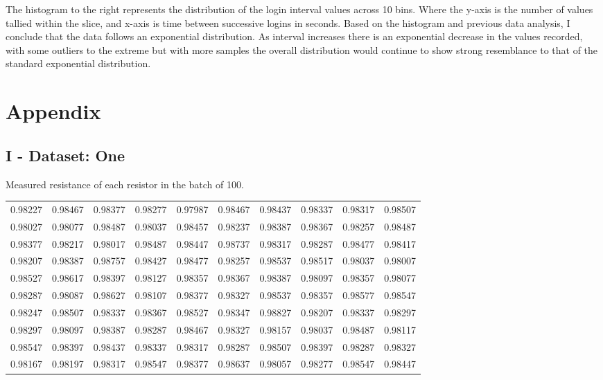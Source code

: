 \documentclass[10pt]{report}
\begin{document}
The histogram to the right represents the distribution of the login interval values across 10 bins.
Where the y-axis is the number of values tallied within the slice, and x-axis is time between successive logins
in seconds.
Based on the histogram and previous data analysis, I conclude that the data follows an exponential distribution. As
interval increases there is an exponential decrease in the values recorded, with some outliers to the extreme but 
with more samples the overall distribution would continue to show strong resemblance to that of the standard
exponential distribution.


\newpage
\section*{Appendix}

\subsection*{I - Dataset: One}

Measured resistance of each resistor in the batch of 100.


\begin{tabular}{rrrrrrrrrr}
    \hline
     0.98227 & 0.98467 & 0.98377 & 0.98277 & 0.97987 & 0.98467 & 0.98437 & 0.98337 & 0.98317 & 0.98507 \\
      0.98027 & 0.98077 & 0.98487 & 0.98037 & 0.98457 & 0.98237 & 0.98387 & 0.98367 & 0.98257 & 0.98487 \\
       0.98377 & 0.98217 & 0.98017 & 0.98487 & 0.98447 & 0.98737 & 0.98317 & 0.98287 & 0.98477 & 0.98417 \\
        0.98207 & 0.98387 & 0.98757 & 0.98427 & 0.98477 & 0.98257 & 0.98537 & 0.98517 & 0.98037 & 0.98007 \\
         0.98527 & 0.98617 & 0.98397 & 0.98127 & 0.98357 & 0.98367 & 0.98387 & 0.98097 & 0.98357 & 0.98077 \\
          0.98287 & 0.98087 & 0.98627 & 0.98107 & 0.98377 & 0.98327 & 0.98537 & 0.98357 & 0.98577 & 0.98547 \\
           0.98247 & 0.98507 & 0.98337 & 0.98367 & 0.98527 & 0.98347 & 0.98827 & 0.98207 & 0.98337 & 0.98297 \\
            0.98297 & 0.98097 & 0.98387 & 0.98287 & 0.98467 & 0.98327 & 0.98157 & 0.98037 & 0.98487 & 0.98117 \\
             0.98547 & 0.98397 & 0.98437 & 0.98337 & 0.98317 & 0.98287 & 0.98507 & 0.98397 & 0.98287 & 0.98327 \\
              0.98167 & 0.98197 & 0.98317 & 0.98547 & 0.98377 & 0.98637 & 0.98057 & 0.98277 & 0.98547 & 0.98447 \\
              \hline
\end{tabular}
\end{document}
